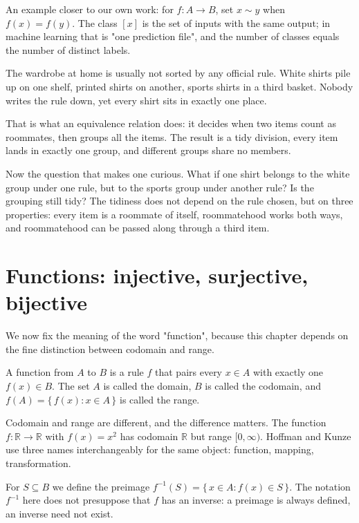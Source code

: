 An example closer to our own work: for $f : A \to B$, set $x \sim y$ when
$f(x) = f(y)$. The class $[x]$ is the set of inputs with the same output; in machine
learning that is "one prediction file", and the number of classes equals the number of
distinct labels.

\begin{untukanak}
The wardrobe at home is usually not sorted by any official rule. White shirts pile up
on one shelf, printed shirts on another, sports shirts in a third basket. Nobody
writes the rule down, yet every shirt sits in exactly one place.

That is what an equivalence relation does: it decides when two items count as
roommates, then groups all the items. The result is a tidy division, every item lands
in exactly one group, and different groups share no members.

Now the question that makes one curious. What if one shirt belongs to the white group
under one rule, but to the sports group under another rule? Is the grouping still
tidy? The tidiness does not depend on the rule chosen, but on three properties: every
item is a roommate of itself, roommatehood works both ways, and roommatehood can be
passed along through a third item.
\end{untukanak}

\section{Functions: injective, surjective, bijective}

We now fix the meaning of the word "function", because this chapter depends on the
fine distinction between codomain and range.

\begin{definisi}[Function]
A function from $A$ to $B$ is a rule $f$ that pairs every $x \in A$ with exactly one
$f(x) \in B$. The set $A$ is called the domain, $B$ is called the codomain, and
$f(A) = \{\, f(x) : x \in A \,\}$ is called the range.
\end{definisi}

Codomain and range are different, and the difference matters. The function
$f : \mathbb{R} \to \mathbb{R}$ with $f(x) = x^{2}$ has codomain $\mathbb{R}$ but
range $[0,\infty)$. Hoffman and Kunze use three names interchangeably for the same
object: function, mapping, transformation.

For $S \subseteq B$ we define the preimage
$f^{-1}(S) = \{\, x \in A : f(x) \in S \,\}$. The notation $f^{-1}$ here does not
presuppose that $f$ has an inverse: a preimage is always defined, an inverse need not
exist.

